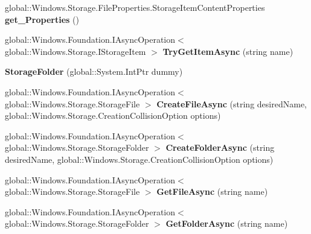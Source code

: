 \begin{DoxyCompactItemize}
global\+::\+Windows.\+Storage.\+File\+Properties.\+Storage\+Item\+Content\+Properties {\bfseries get\+\_\+\+Properties} ()
\item 
\mbox{\label{class_windows_1_1_storage_1_1_storage_folder_a1fb213152c9afc34cd979395c35450f9}} 
global\+::\+Windows.\+Foundation.\+I\+Async\+Operation$<$ global\+::\+Windows.\+Storage.\+I\+Storage\+Item $>$ {\bfseries Try\+Get\+Item\+Async} (string name)
\item 
\mbox{\label{class_windows_1_1_storage_1_1_storage_folder_a3088d0d3f00525cc36b786ec7b321398}} 
{\bfseries Storage\+Folder} (global\+::\+System.\+Int\+Ptr dummy)
\item 
\mbox{\label{class_windows_1_1_storage_1_1_storage_folder_a1148f0c45b571856ab96a2bf97e2dd87}} 
global\+::\+Windows.\+Foundation.\+I\+Async\+Operation$<$ global\+::\+Windows.\+Storage.\+Storage\+File $>$ {\bfseries Create\+File\+Async} (string desired\+Name, global\+::\+Windows.\+Storage.\+Creation\+Collision\+Option options)
\item 
\mbox{\label{class_windows_1_1_storage_1_1_storage_folder_ad7abc9e33097dc2a8e60d66d76e5558c}} 
global\+::\+Windows.\+Foundation.\+I\+Async\+Operation$<$ global\+::\+Windows.\+Storage.\+Storage\+Folder $>$ {\bfseries Create\+Folder\+Async} (string desired\+Name, global\+::\+Windows.\+Storage.\+Creation\+Collision\+Option options)
\item 
\mbox{\label{class_windows_1_1_storage_1_1_storage_folder_a3766a445bb3e86f2bf570d83084bb729}} 
global\+::\+Windows.\+Foundation.\+I\+Async\+Operation$<$ global\+::\+Windows.\+Storage.\+Storage\+File $>$ {\bfseries Get\+File\+Async} (string name)
\item 
\mbox{\label{class_windows_1_1_storage_1_1_storage_folder_abb723045c2ef18ea0a93b5788948994c}} 
global\+::\+Windows.\+Foundation.\+I\+Async\+Operation$<$ global\+::\+Windows.\+Storage.\+Storage\+Folder $>$ {\bfseries Get\+Folder\+Async} (string name)
\item 
\mbox{\label{class_windows_1_1_storage_1_1_storage_folder_ac931af40aac04b2aff19610399dbae2e}} 

\end{DoxyCompactItemize}
